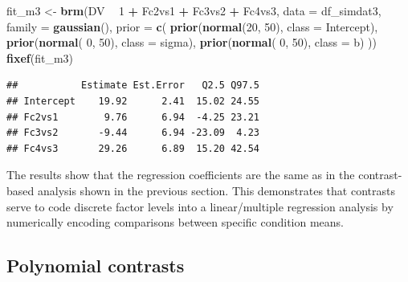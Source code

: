 \documentclass[12pt,]{krantz}
\newenvironment{Shaded}{\begin{snugshade}}{\end{snugshade}}
\newcommand{\KeywordTok}[1]{\textcolor[rgb]{0.13,0.29,0.53}{\textbf{#1}}}
\newcommand{\DataTypeTok}[1]{\textcolor[rgb]{0.13,0.29,0.53}{#1}}
\newcommand{\DecValTok}[1]{\textcolor[rgb]{0.00,0.00,0.81}{#1}}
\newcommand{\StringTok}[1]{\textcolor[rgb]{0.31,0.60,0.02}{#1}}
\newcommand{\OperatorTok}[1]{\textcolor[rgb]{0.81,0.36,0.00}{\textbf{#1}}}
\newcommand{\NormalTok}[1]{#1}
\theoremstyle{definition}
\theoremstyle{definition}
\theoremstyle{definition}
\theoremstyle{remark}
\begin{document}
\begin{Shaded}
\begin{Highlighting}[]
\NormalTok{fit_m3 <-}\StringTok{ }\KeywordTok{brm}\NormalTok{(DV }\OperatorTok{~}\StringTok{ }\DecValTok{1} \OperatorTok{+}\StringTok{ }\NormalTok{Fc2vs1 }\OperatorTok{+}\StringTok{ }\NormalTok{Fc3vs2 }\OperatorTok{+}\StringTok{ }\NormalTok{Fc4vs3,}
                 \DataTypeTok{data =}\NormalTok{ df_simdat3,}
                 \DataTypeTok{family =} \KeywordTok{gaussian}\NormalTok{(),}
                 \DataTypeTok{prior =} \KeywordTok{c}\NormalTok{(}
                     \KeywordTok{prior}\NormalTok{(}\KeywordTok{normal}\NormalTok{(}\DecValTok{20}\NormalTok{, }\DecValTok{50}\NormalTok{), }\DataTypeTok{class =}\NormalTok{ Intercept),}
                     \KeywordTok{prior}\NormalTok{(}\KeywordTok{normal}\NormalTok{( }\DecValTok{0}\NormalTok{, }\DecValTok{50}\NormalTok{), }\DataTypeTok{class =}\NormalTok{ sigma),}
                     \KeywordTok{prior}\NormalTok{(}\KeywordTok{normal}\NormalTok{( }\DecValTok{0}\NormalTok{, }\DecValTok{50}\NormalTok{), }\DataTypeTok{class =}\NormalTok{ b)}
\NormalTok{                 )) }
\KeywordTok{fixef}\NormalTok{(fit_m3)}
\end{Highlighting}
\end{Shaded}

\begin{verbatim}
##           Estimate Est.Error   Q2.5 Q97.5
## Intercept    19.92      2.41  15.02 24.55
## Fc2vs1        9.76      6.94  -4.25 23.21
## Fc3vs2       -9.44      6.94 -23.09  4.23
## Fc4vs3       29.26      6.89  15.20 42.54
\end{verbatim}

The results show that the regression coefficients are the same as in the
contrast-based analysis shown in the previous section. This demonstrates
that contrasts serve to code discrete factor levels into a
linear/multiple regression analysis by numerically encoding comparisons
between specific condition means.

\hypertarget{polynomialContrasts}{\subsection{Polynomial
contrasts}\label{polynomialContrasts}}
\end{document}
